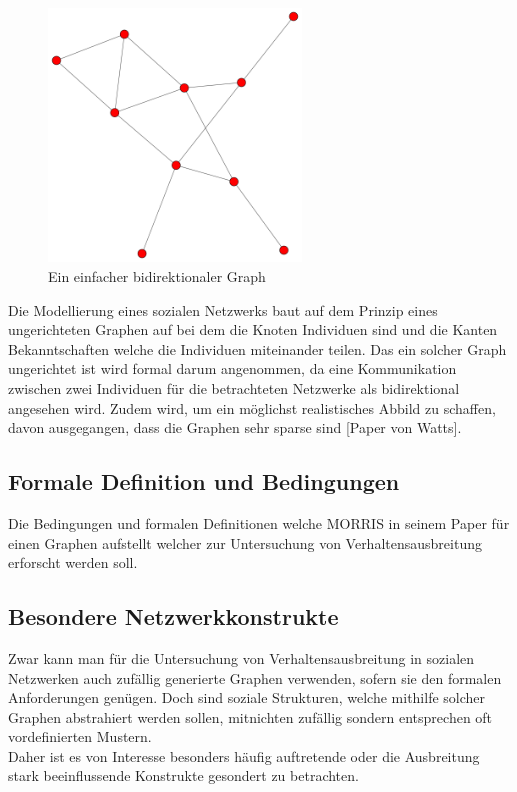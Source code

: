 \documentclass[12pt]{article}
\begin{document}
\begin{figure}
  \begin{center}
    \includegraphics[width=0.60\textwidth]{pic_simpleGraph.png}
  \end{center}
  \caption{Ein einfacher bidirektionaler Graph}
\end{figure}


Die Modellierung eines sozialen Netzwerks baut auf dem Prinzip eines ungerichteten Graphen auf bei dem die Knoten Individuen sind und die Kanten Bekanntschaften welche die Individuen miteinander teilen. Das ein solcher Graph ungerichtet ist wird formal darum angenommen, da eine Kommunikation zwischen zwei Individuen für die betrachteten Netzwerke als bidirektional angesehen wird. Zudem wird, um ein möglichst realistisches Abbild zu schaffen, davon ausgegangen, dass die Graphen sehr sparse sind [Paper von Watts].
\subsection{Formale Definition und Bedingungen}
Die Bedingungen und formalen Definitionen welche MORRIS in seinem Paper für einen Graphen aufstellt welcher zur Untersuchung von Verhaltensausbreitung erforscht werden soll.
\subsection{Besondere Netzwerkkonstrukte}
Zwar kann man für die Untersuchung von Verhaltensausbreitung in sozialen Netzwerken auch zufällig generierte Graphen verwenden, sofern sie den formalen Anforderungen genügen. Doch sind soziale Strukturen, welche mithilfe solcher Graphen abstrahiert werden sollen, mitnichten zufällig sondern entsprechen oft vordefinierten Mustern.\\ Daher ist es von Interesse besonders häufig auftretende oder die Ausbreitung stark beeinflussende Konstrukte gesondert zu betrachten.
\end{document}
